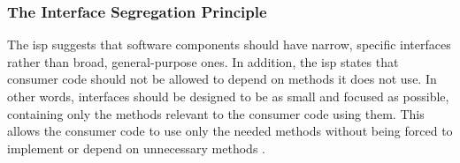 \subsubsection{The Interface Segregation Principle} \label{subsubsec_isp}

The \gls{isp} suggests that software components should have narrow, specific interfaces
rather than broad, general-purpose ones. In addition, the \gls{isp} states that consumer
code should not be allowed to depend on methods it does not use. In other words,
interfaces should be designed to be as small and focused as possible, containing only the
methods relevant to the consumer code using them. This allows the consumer code to use
only the needed methods without being forced to implement or depend on unnecessary methods
\parencite[104]{robert_c_martin_clean_2018}. 
